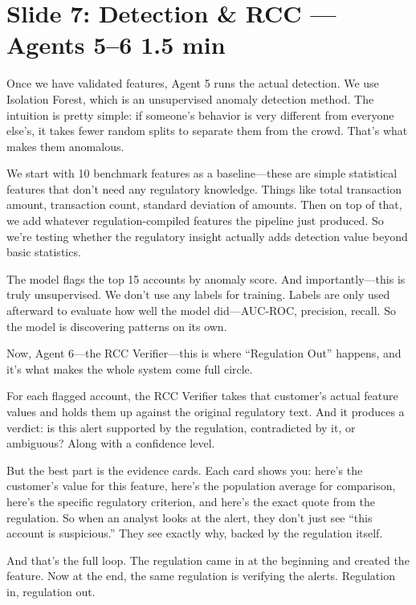 \documentclass[11pt, a4paper]{article}
\newcommand{\timing}[1]{{\hfill\small\color{gray}#1}}
\begin{document}
\section{Slide 7: Detection \& RCC --- Agents 5--6 \timing{1.5 min}}

Once we have validated features, Agent 5 runs the actual detection. We use Isolation Forest, which is an unsupervised anomaly detection method. The intuition is pretty simple: if someone's behavior is very different from everyone else's, it takes fewer random splits to separate them from the crowd. That's what makes them anomalous.

We start with 10 benchmark features as a baseline---these are simple statistical features that don't need any regulatory knowledge. Things like total transaction amount, transaction count, standard deviation of amounts. Then on top of that, we add whatever regulation-compiled features the pipeline just produced. So we're testing whether the regulatory insight actually adds detection value beyond basic statistics.

The model flags the top 15 accounts by anomaly score. And importantly---this is truly unsupervised. We don't use any labels for training. Labels are only used afterward to evaluate how well the model did---AUC-ROC, precision, recall. So the model is discovering patterns on its own.

Now, Agent 6---the RCC Verifier---this is where ``Regulation Out'' happens, and it's what makes the whole system come full circle.

For each flagged account, the RCC Verifier takes that customer's actual feature values and holds them up against the original regulatory text. And it produces a verdict: is this alert supported by the regulation, contradicted by it, or ambiguous? Along with a confidence level.

But the best part is the evidence cards. Each card shows you: here's the customer's value for this feature, here's the population average for comparison, here's the specific regulatory criterion, and here's the exact quote from the regulation. So when an analyst looks at the alert, they don't just see ``this account is suspicious.'' They see exactly why, backed by the regulation itself.

And that's the full loop. The regulation came in at the beginning and created the feature. Now at the end, the same regulation is verifying the alerts. Regulation in, regulation out.
\end{document}
